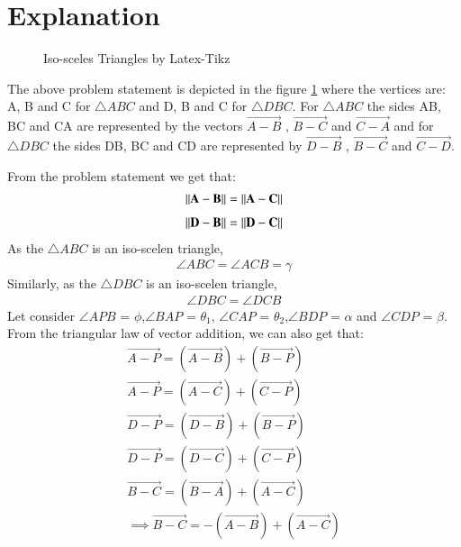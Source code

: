 \documentclass[journal,12pt,twocolumn]{IEEEtran}
\begin{document}
\section{Explanation}
\begin{figure}[!ht]
\centering
\resizebox{\columnwidth}{!}{}
\caption{Iso-sceles Triangles by Latex-Tikz}
\label{fig:iso_scelen}	
\end{figure}

The above problem statement is depicted in the figure \ref{fig:iso_scelen} where the vertices are: A, B and C for $\triangle ABC$ and D, B and C for $\triangle DBC$. For $\triangle ABC$ the sides AB, BC and CA are represented by the vectors $\vec{A-B}$ , $\vec{B-C}$ and $\vec{C-A}$ and for $\triangle DBC$ the sides DB, BC and CD are represented by $\vec{D-B}$ , $\vec{B-C}$ and $\vec{C-D}$.

From the problem statement we get that:
\begin{equation}
\begin{aligned}
\left\lVert\mathbf{A}-\mathbf{B}\right\rVert = \left\lVert\mathbf{A}-\mathbf{C}\right\rVert
\end{aligned}
\end{equation}
\label{cond1}
\begin{align}
\left\lVert\mathbf{D}-\mathbf{B}\right\rVert = \left\lVert\mathbf{D}-\mathbf{C}\right\rVert
\end{align}
\label{cond2}
As the $\triangle ABC$ is an iso-scelen triangle,
\begin{align}
\angle ABC = \angle ACB =\gamma
\end{align}
Similarly, as the $\triangle DBC$ is an iso-scelen triangle,
\begin{align}
\angle DBC = \angle DCB 
\end{align}
Let consider $\angle APB$ = $\phi$,$\angle BAP$ = $\theta_1$, $\angle CAP$ = $\theta_2$,$\angle BDP$ = $\alpha$ and $\angle CDP$ = $\beta$.
From the triangular law of vector addition, we can also get that:
\begin{align}
\vec{A-P} = (\vec{A-B}) + (\vec{B-P})\\
\vec{A-P} = (\vec{A-C}) + (\vec{C-P})\\
\vec{D-P} = (\vec{D-B}) + (\vec{B-P})\\
\vec{D-P} = (\vec{D-C}) + (\vec{C-P})\\
\vec{B-C} = (\vec{B-A}) + (\vec{A-C})\\
\implies \vec{B-C} = -(\vec{A-B}) + (\vec{A-C})
\end{align}
\end{document}
